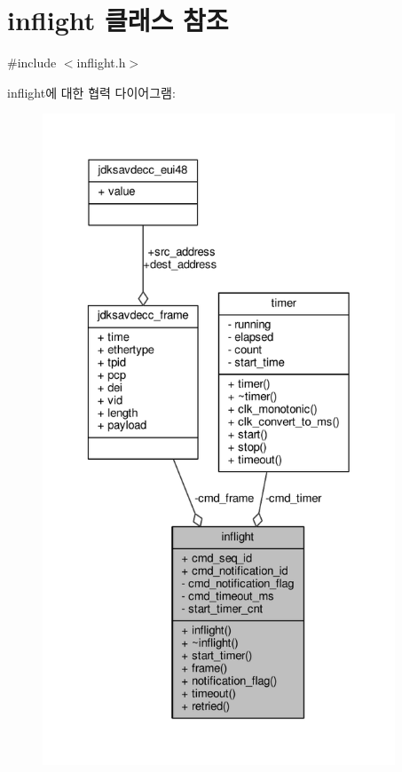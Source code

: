 \hypertarget{classavdecc__lib_1_1inflight}{}\section{inflight 클래스 참조}
\label{classavdecc__lib_1_1inflight}


{\ttfamily \#include $<$inflight.\+h$>$}



inflight에 대한 협력 다이어그램\+:
\nopagebreak
\begin{figure}[H]
\begin{center}
\leavevmode
\includegraphics[height=550pt]{classavdecc__lib_1_1inflight__coll__graph}
\end{center}
\end{figure}
